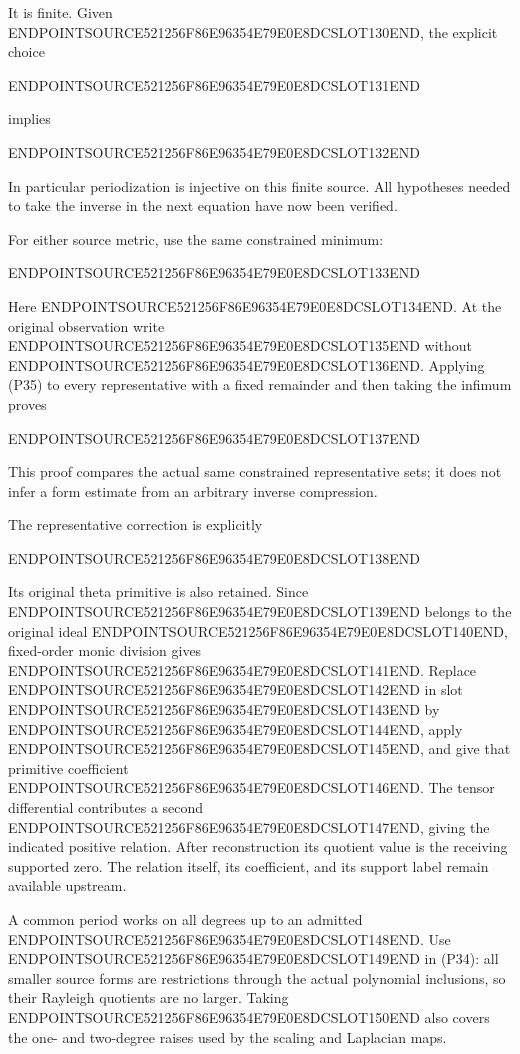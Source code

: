 It is finite. Given ENDPOINTSOURCE521256F86E96354E79E0E8DCSLOT130END, the explicit choice

ENDPOINTSOURCE521256F86E96354E79E0E8DCSLOT131END

implies

ENDPOINTSOURCE521256F86E96354E79E0E8DCSLOT132END

In particular periodization is injective on this finite source. All hypotheses needed to take the inverse in the next equation have now been verified.

For either source metric, use the same constrained minimum:

ENDPOINTSOURCE521256F86E96354E79E0E8DCSLOT133END

Here ENDPOINTSOURCE521256F86E96354E79E0E8DCSLOT134END. At the original observation write ENDPOINTSOURCE521256F86E96354E79E0E8DCSLOT135END without ENDPOINTSOURCE521256F86E96354E79E0E8DCSLOT136END. Applying (P35) to every representative with a fixed remainder and then taking the infimum proves

ENDPOINTSOURCE521256F86E96354E79E0E8DCSLOT137END

This proof compares the actual same constrained representative sets; it does not infer a form estimate from an arbitrary inverse compression.

The representative correction is explicitly

ENDPOINTSOURCE521256F86E96354E79E0E8DCSLOT138END

Its original theta primitive is also retained. Since ENDPOINTSOURCE521256F86E96354E79E0E8DCSLOT139END belongs to the original ideal ENDPOINTSOURCE521256F86E96354E79E0E8DCSLOT140END, fixed-order monic division gives ENDPOINTSOURCE521256F86E96354E79E0E8DCSLOT141END. Replace ENDPOINTSOURCE521256F86E96354E79E0E8DCSLOT142END in slot ENDPOINTSOURCE521256F86E96354E79E0E8DCSLOT143END by ENDPOINTSOURCE521256F86E96354E79E0E8DCSLOT144END, apply ENDPOINTSOURCE521256F86E96354E79E0E8DCSLOT145END, and give that primitive coefficient ENDPOINTSOURCE521256F86E96354E79E0E8DCSLOT146END. The tensor differential contributes a second ENDPOINTSOURCE521256F86E96354E79E0E8DCSLOT147END, giving the indicated positive relation. After reconstruction its quotient value is the receiving supported zero. The relation itself, its coefficient, and its support label remain available upstream.

A common period works on all degrees up to an admitted ENDPOINTSOURCE521256F86E96354E79E0E8DCSLOT148END. Use ENDPOINTSOURCE521256F86E96354E79E0E8DCSLOT149END in (P34): all smaller source forms are restrictions through the actual polynomial inclusions, so their Rayleigh quotients are no larger. Taking ENDPOINTSOURCE521256F86E96354E79E0E8DCSLOT150END also covers the one- and two-degree raises used by the scaling and Laplacian maps.

